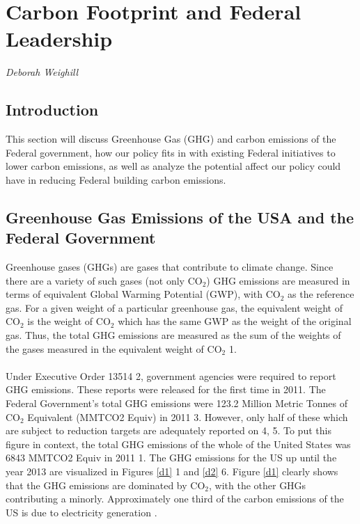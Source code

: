 \section{Carbon Footprint and Federal Leadership}
\textit{Deborah Weighill}

\subsection{Introduction}
This section will discuss Greenhouse Gas (GHG) and carbon emissions of the Federal government, how our policy fits in with existing Federal initiatives to lower carbon emissions, as well as analyze the potential affect our policy could have in reducing Federal building carbon emissions.

\subsection{Greenhouse Gas Emissions of the USA and the Federal Government}
Greenhouse gases (GHGs) are gases that contribute to climate change. Since there are a variety of such gases (not only CO$_{2}$) GHG emissions are measured in terms of equivalent Global Warming Potential (GWP), with CO$_{2}$ as the reference gas. For a given weight of a particular greenhouse gas, the equivalent weight of CO$_{2}$ is the weight of CO$_{2}$ which has the same GWP as the weight of the original gas. Thus, the total GHG emissions are measured as the sum of the weights of the gases measured in the equivalent weight of CO$_{2}$ \cite{deb}{1}.
\\\\
\noindent Under Executive Order 13514 \cite{deb}{2}, government agencies were required to report GHG emissions. These reports were released for the first time in 2011. The Federal Government's total GHG emissions were 123.2 Million Metric Tonnes of CO$_{2}$ Equivalent (MMTCO2 Equiv) in 2011 \cite{deb}{3}. However, only half of these which are subject to reduction targets are adequately reported on \cite{deb}{4, 5}. To put this figure in context, the total GHG emissions of the whole of the United States was 6843 MMTCO2 Equiv in 2011 \cite{deb}{1}. The GHG emissions for the US up until the year 2013 are visualized in Figures \ref{d1} \cite{deb}{1} and \ref{d2} \cite{deb}{6}. Figure \ref{d1} clearly shows that the GHG emissions are dominated by CO$_{2}$, with the other GHGs contributing a minorly. Approximately one third of the carbon emissions of the US is due to electricity generation \cite{newfigsepa2}.

